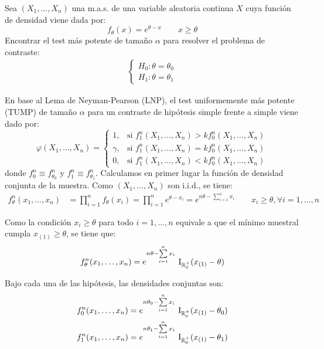 \begin{ejercicio}
    Sea $(X_1, \dots, X_n)$ una m.a.s. de una variable aleatoria continua $X$ cuya función de densidad viene dada por:
    \begin{equation*}
        f_\theta(x) = e^{\theta - x}\qquad x \geq \theta
    \end{equation*}
    Encontrar el test más potente de tamaño $\alpha$ para resolver el problema de contraste:
    \begin{align*}
        \begin{cases}
        H_0: \theta = \theta_0 \\
        H_1: \theta = \theta_1
        \end{cases}
    \end{align*}

    En base al Lema de Neyman-Pearson (LNP), el test uniformemente más potente (TUMP) de tamaño $\alpha$ para un contraste de hipótesis simple frente a simple viene dado por:
    \begin{equation*}
        \varphi(X_1, \dots, X_n) =
        \begin{cases}
            1, & \text{si } f_1^n(X_1, \dots, X_n) > k f_0^n(X_1, \dots, X_n) \\
            \gamma, & \text{si } f_1^n(X_1, \dots, X_n) = k f_0^n(X_1, \dots, X_n) \\
            0, & \text{si } f_1^n(X_1, \dots, X_n) < k f_0^n(X_1, \dots, X_n)
        \end{cases}
    \end{equation*}
    donde $f_0^n \equiv f_{\theta_0}^n$ y $f_1^n \equiv f_{\theta_1}^n$. Calculamos en primer lugar la función de densidad conjunta de la muestra. Como $(X_1, \dots, X_n)$ son i.i.d.,  se tiene:
    \begin{align*}
        f_\theta^n(x_1, \dots, x_n) &= \prod_{i=1}^{n} f_\theta(x_i) = \prod_{i=1}^{n} e^{\theta - x_i} = e^{n\theta - \sum\limits_{i=1}^{n} x_i}\qquad x_i \geq \theta, \forall i=1,\dots,n
    \end{align*}

    Como la condición $x_i \ge \theta$ para todo $i=1,\dots,n$ equivale a que el mínimo muestral cumpla $x_{(1)} \ge \theta$, se tiene que:
    \begin{equation*}
        f_\theta^n(x_1, \dots, x_n) = e^{n\theta - \sum\limits_{i=1}^{n} x_i} \,\operatorname{I}_{\mathbb{R}^+_0}(x_{(1)} - \theta)
    \end{equation*}

    Bajo cada una de las hipótesis, las densidades conjuntas son:
    \begin{align*}
        f_0^n(x_1, \dots, x_n) &= e^{n\theta_0 - \sum\limits_{i=1}^{n} x_i} \,\operatorname{I}_{\mathbb{R}^+_0}(x_{(1)} - \theta_0) \\
        f_1^n(x_1, \dots, x_n) &= e^{n\theta_1 - \sum\limits_{i=1}^{n} x_i} \,\operatorname{I}_{\mathbb{R}^+_0}(x_{(1)} - \theta_1)
    \end{align*}


\end{ejercicio}
